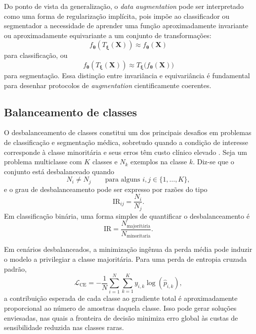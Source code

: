 \documentclass[tcc,capa]{texufpel}
\begin{document}
Do ponto de vista da generalização, o \textit{data augmentation} pode ser interpretado como uma forma de regularização implícita, pois impõe ao classificador ou segmentador a necessidade de aprender uma função aproximadamente invariante ou aproximadamente equivariante a um conjunto de transformações:
\begin{equation}
	f_{\boldsymbol{\theta}}(T_{\boldsymbol{\xi}}(\mathbf{X}))
	\approx
	f_{\boldsymbol{\theta}}(\mathbf{X})
\end{equation}
para classificação, ou
\begin{equation}
	f_{\boldsymbol{\theta}}(T_{\boldsymbol{\xi}}(\mathbf{X}))
	\approx
	T_{\boldsymbol{\xi}}\big(f_{\boldsymbol{\theta}}(\mathbf{X})\big)
\end{equation}
para segmentação. Essa distinção entre invariância e equivariância é fundamental para desenhar protocolos de \textit{augmentation} cientificamente coerentes.

\subsection{Balanceamento de classes}

O desbalanceamento de classes constitui um dos principais desafios em problemas de classificação e segmentação médica, sobretudo quando a condição de interesse corresponde à classe minoritária e seus erros têm custo clínico elevado \cite{He2009,Branco2016}. Seja um problema multiclasse com \(K\) classes e \(N_k\) exemplos na classe \(k\). Diz-se que o conjunto está desbalanceado quando
\begin{equation}
	N_i \neq N_j
	\qquad \text{para alguns } i,j \in \{1,\dots,K\},
\end{equation}
e o grau de desbalanceamento pode ser expresso por razões do tipo
\begin{equation}
	\mathrm{IR}_{ij} = \frac{N_i}{N_j}.
\end{equation}
Em classificação binária, uma forma simples de quantificar o desbalanceamento é
\begin{equation}
	\mathrm{IR} = \frac{N_{\text{majoritária}}}{N_{\text{minoritaria}}}.
\end{equation}

Em cenários desbalanceados, a minimização ingênua da perda média pode induzir o modelo a privilegiar a classe majoritária. Para uma perda de entropia cruzada padrão,
\begin{equation}
	\mathcal{L}_{\text{CE}}
	=
	-\frac{1}{N}\sum_{i=1}^{N}\sum_{k=1}^{K} y_{i,k}\log(\hat{p}_{i,k}),
\end{equation}
a contribuição esperada de cada classe ao gradiente total é aproximadamente proporcional ao número de amostras daquela classe. Isso pode gerar soluções enviesadas, nas quais a fronteira de decisão minimiza erro global às custas de sensibilidade reduzida nas classes raras.
\end{document}
